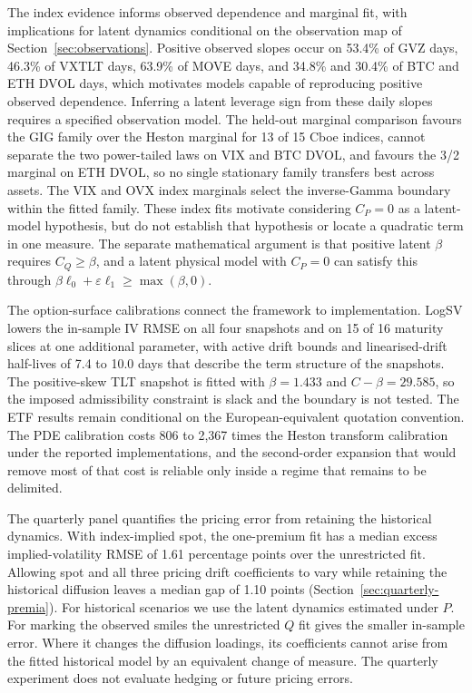 \documentclass[11pt,a4paper]{article}
\theoremstyle{definition}
\theoremstyle{remark}
\newcommand{\betaPosMOVE}{63.9}
\newcommand{\betaPosGVZ}{53.4}
\newcommand{\betaPosVXTLT}{46.3}
\newcommand{\panelCount}{15}
\newcommand{\panelGigWins}{13}
\newcommand{\betaPosBTCDVOL}{34.8}
\newcommand{\betaPosETHDVOL}{30.4}
\newcommand{\fitRatioMax}{2,367}
\newcommand{\fitRatioMin}{806}
\newcommand{\halfLifeLogSVMin}{7.4}
\newcommand{\halfLifeLogSVMax}{10.0}
\newcommand{\improvedSlices}{15}
\newcommand{\totalSlices}{16}
\newcommand{\positiveBeta}{1.433}
\newcommand{\positiveMargin}{29.585}
\newcommand{\quarterlyIndexGap}{1.61}
\newcommand{\quarterlyDriftGap}{1.10}
\begin{document}
The index evidence informs observed dependence and marginal fit, with implications for latent dynamics conditional on the observation map of Section~\ref{sec:observations}. Positive observed slopes occur on \betaPosGVZ\% of GVZ days, \betaPosVXTLT\% of VXTLT days, \betaPosMOVE\% of MOVE days, and \betaPosBTCDVOL\% and \betaPosETHDVOL\% of BTC and ETH DVOL days, which motivates models capable of reproducing positive observed dependence. Inferring a latent leverage sign from these daily slopes requires a specified observation model. The held-out marginal comparison favours the GIG family over the Heston marginal for \panelGigWins{} of \panelCount{} Cboe indices, cannot separate the two power-tailed laws on VIX and BTC DVOL, and favours the 3/2 marginal on ETH DVOL, so no single stationary family transfers best across assets. The VIX and OVX index marginals select the inverse-Gamma boundary within the fitted family. These index fits motivate considering \(C_P=0\) as a latent-model hypothesis, but do not establish that hypothesis or locate a quadratic term in one measure. The separate mathematical argument is that positive latent \(\beta\) requires \(C_Q\geq\beta\), and a latent physical model with \(C_P=0\) can satisfy this through \(\beta\ell_0+\varepsilon\ell_1\geq\max(\beta,0)\).

The option-surface calibrations connect the framework to implementation. LogSV lowers the in-sample IV RMSE on all four snapshots and on \improvedSlices{} of \totalSlices{} maturity slices at one additional parameter, with active drift bounds and linearised-drift half-lives of \halfLifeLogSVMin{} to \halfLifeLogSVMax{} days that describe the term structure of the snapshots. The positive-skew TLT snapshot is fitted with \(\beta=\positiveBeta\) and \(C-\beta=\positiveMargin\), so the imposed admissibility constraint is slack and the boundary is not tested. The ETF results remain conditional on the European-equivalent quotation convention. The PDE calibration costs \fitRatioMin{} to \fitRatioMax{} times the Heston transform calibration under the reported implementations, and the second-order expansion that would remove most of that cost is reliable only inside a regime that remains to be delimited.

The quarterly panel quantifies the pricing error from retaining the historical dynamics. With index-implied spot, the one-premium fit has a median excess implied-volatility RMSE of \quarterlyIndexGap{} percentage points over the unrestricted fit. Allowing spot and all three pricing drift coefficients to vary while retaining the historical diffusion leaves a median gap of \quarterlyDriftGap{} points (Section~\ref{sec:quarterly-premia}). For historical scenarios we use the latent dynamics estimated under $P$. For marking the observed smiles the unrestricted $Q$ fit gives the smaller in-sample error. Where it changes the diffusion loadings, its coefficients cannot arise from the fitted historical model by an equivalent change of measure. The quarterly experiment does not evaluate hedging or future pricing errors.
\end{document}
